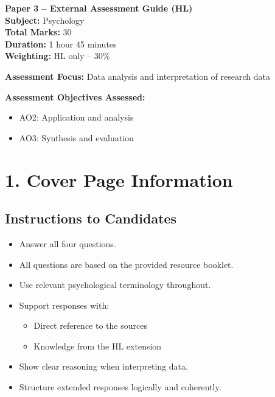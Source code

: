 \documentclass[12pt,a4paper]{article}
\begin{document}
\begin{center}
    {\LARGE \textbf{Paper 3 – External Assessment Guide (HL)}}\\
    \vspace{0.5em}
    \textbf{Subject:} Psychology\\
    \textbf{Total Marks:} 30\\
    \textbf{Duration:} 1 hour 45 minutes\\
    \textbf{Weighting:} HL only – 30\%
\end{center}

\vspace{1em}

\textbf{Assessment Focus:} Data analysis and interpretation of research data  

\textbf{Assessment Objectives Assessed:}
\begin{itemize}
    \item AO2: Application and analysis
    \item AO3: Synthesis and evaluation
\end{itemize}

\section*{1. Cover Page Information}

\subsection*{Instructions to Candidates}

\begin{itemize}
    \item Answer all four questions.
    \item All questions are based on the provided resource booklet.
    \item Use relevant psychological terminology throughout.
    \item Support responses with:
    \begin{itemize}
        \item Direct reference to the sources
        \item Knowledge from the HL extension
    \end{itemize}
    \item Show clear reasoning when interpreting data.
    \item Structure extended responses logically and coherently.
\end{itemize}
\end{document}
